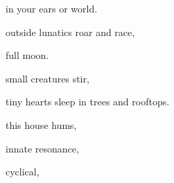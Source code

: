 \documentclass[extrafontsizes, 48pt]{memoir}
\newcommand\blankpage{%
    \null
    \thispagestyle{empty}%
    \addtocounter{page}{-1}%
    \newpage}
\begin{document}
	\begin{minipage}{.6\textwidth}
	in your ears or world.
	\afterpage{\blankpage}
	\end{minipage}
	\newpage

	\begin{minipage}{.6\textwidth}
	outside lunatics roar and race,
	\end{minipage}
	\newpage

	\begin{minipage}{.6\textwidth}
	full moon.
	\end{minipage}
	\newpage

	\begin{minipage}{.6\textwidth}
	small creatures stir,
	\end{minipage}
	\newpage

	\begin{minipage}{.6\textwidth}
	tiny hearts sleep in trees and rooftops.
	\afterpage{\blankpage}
	\end{minipage}
	\newpage

	\begin{minipage}{.6\textwidth}
	this house hums,
	\end{minipage}
	\newpage

	\begin{minipage}{.6\textwidth}
	innate resonance,
	\end{minipage}
	\newpage

	\begin{minipage}{.6\textwidth}
	cyclical,
	\end{minipage}
	\newpage
\end{document}
